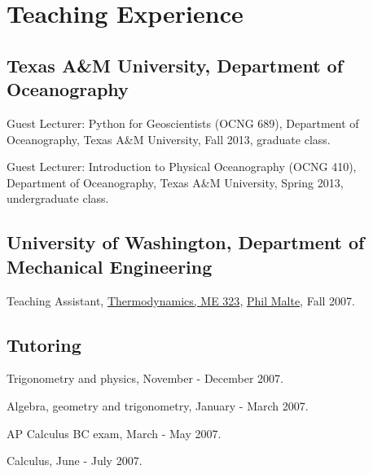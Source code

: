 \documentclass[10pt,letterpaper]{article}
\renewenvironment{itemize}{
  \begin{list}{}{
    \setlength{\leftmargin}{1.5em}
    \setlength{\itemsep}{0.25em}
    \setlength{\parskip}{0pt}
    \setlength{\parsep}{0.25em}
  }
}{
  \end{list}
}
\begin{document}
\section*{Teaching Experience}

\subsection*{Texas A\&M University, Department of Oceanography}

\begin{itemize}

\item Guest Lecturer: Python for Geoscientists (OCNG 689), Department of Oceanography, Texas A\&M University, Fall 2013, graduate class.
\item Guest Lecturer: Introduction to Physical Oceanography (OCNG 410), Department of Oceanography, Texas A\&M University, Spring 2013, undergraduate class.

\end{itemize}

\subsection*{University of Washington, Department of Mechanical Engineering}

\begin{itemize}

\item Teaching Assistant,
  \href{http://www.washington.edu/students/crscat/meche.html#me323}{Thermodynamics, ME 323},
  \href{http://www.me.washington.edu/research/faculty/malte/}{Phil Malte},
  Fall 2007.

\end{itemize}

\subsection*{Tutoring}

\begin{itemize}
	\item Trigonometry and physics, November - December 2007.
	\item Algebra, geometry and trigonometry, January - March 2007.
	\item AP Calculus BC exam, March - May 2007.
	\item Calculus, June - July  2007.
\end{itemize}
\end{document}
